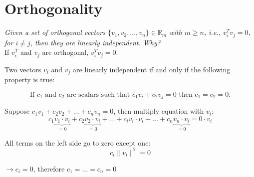 \documentclass{scrartcl}
\begin{document}
\section{Orthogonality}
\textit{Given a set of orthogonal vectors $\{v_1, v_2, ..., v_n\} \in \mathbb{R}_m$ with $m\geq n$, i.e., $v_i^T v_j = 0$, for $i\neq j$, then they are linearly independent. Why?}\\


If $v_i^T$ and $v_j$ are orthogonal, $v_i^T v_j = 0$.

Two vectors $v_i$ and $v_j$ are linearly independent if and only if the following property is true:

$$\text{If } c_1 \text{ and } c_2 \text{ are scalars such that } c_1v_i + c_2v_j = 0 \text{ then } c_1 = c_2 = 0.$$

Suppose $c_1v_1 + c_2v_2 + ... + c_nv_n = 0$, then multiply equation with $v_i$:\\
$$c_1\underbrace{v_1 \cdot v_i}_{=0} + c_2\underbrace{v_2 \cdot v_i}_{=0} + ...  + c_iv_i \cdot v_i+ ... + c_n\underbrace{v_n \cdot v_i}_{=0} = 0 \cdot v_i$$

All terms on the left side go to zero except one:
$$c_i \|v_i\|^2 = 0$$

$\rightarrow c_i = 0$, therefore $c_1 = ... = c_n = 0$ \\
%
%
\end{document}
